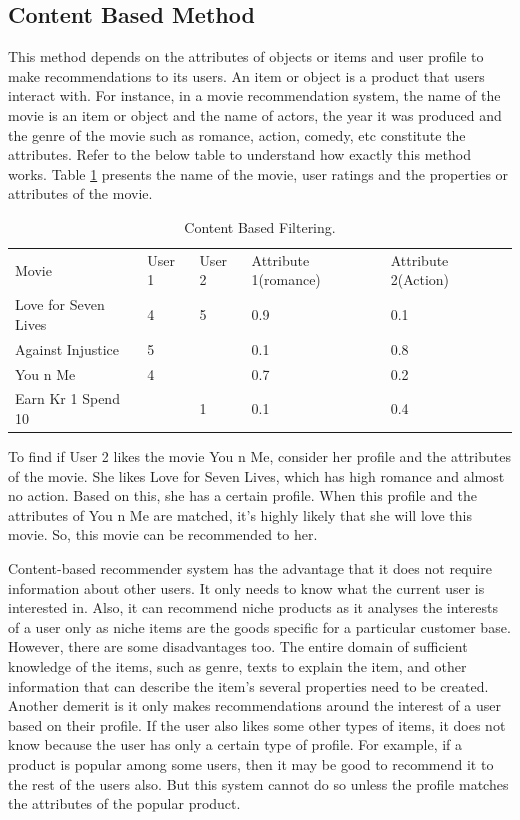 \documentclass{jot}
\begin{document}
\subsection{Content Based Method}
This method depends on the attributes of objects or items and user profile to make recommendations to its users. An item or object is a product that users interact with. For instance, in a movie recommendation system, the name of the movie is an item or object and the name of actors, the year it was produced and the genre of the movie such as romance, action, comedy, etc constitute the attributes. Refer to the below table to understand how exactly this method works. Table \ref{tab:content-based} presents the name of the movie, user ratings and the properties or attributes of the movie.

\begin{table}[h!]
\begin{tabular}{lllll}
Movie                & User 1 & User 2 & Attribute 1(romance) & Attribute 2(Action) \\
Love for Seven Lives & 4      & 5      & 0.9                   & 0.1                  \\
Against Injustice    & 5      &        & 0.1                   & 0.8                  \\
You n Me             & 4      &        & 0.7                   & 0.2                  \\
Earn Kr 1 Spend 10   &        & 1      & 0.1                   & 0.4                  \\
\end{tabular}
\caption{Content Based Filtering.}
\label{tab:content-based}
\end{table}

To find  if User 2 likes the movie You n Me, consider her profile and the attributes of the movie. She likes Love for Seven Lives, which has high romance and almost no action. Based on this, she has a certain profile. When this profile and the attributes of You n Me are matched, it’s highly likely that she will love this movie. So, this movie can be recommended to her.

Content-based recommender system has the advantage that it does not require information about other users. It only needs to know what the current user is interested in. Also, it can recommend niche products as it analyses the interests of a user only as niche items are the goods specific for a particular customer base. However, there are some disadvantages too. The entire domain of sufficient knowledge of the items, such as genre, texts to explain the item, and other information that can describe the item’s several properties need to be created. Another demerit is it only makes recommendations around the interest of a user based on their profile. If the user also likes some other types of items, it does not know because the user has only a certain type of profile. For example, if a product is  popular among some users, then it may be good to recommend it to the rest of the users also. But this system cannot do so unless the profile matches the attributes of the popular product.
\end{document}
